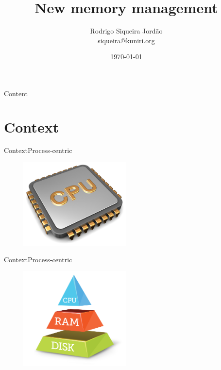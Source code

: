 \documentclass[10pt]{beamer}
\title[] %
{ %
  \textbf{New memory management}
}
\subtitle[SpaceJMP a new approach]
{
}
\author[Rodrigo Siqueira Jordão]
{      Rodrigo Siqueira Jordão \\
      {\ttfamily siqueira@kuniri.org}
}
\institute[]
{
  University of Sao Paulo\\
  Institute of Mathematics and Statistics\\
  
}
\date{\today}
\begin{document}

{\1%
\begin{frame} 
  \titlepage %
\end{frame}}

\begin{frame}[shrink]{Content}{}
  \tableofcontents
\end{frame}

\section{Context}
\begin{frame}{Context}{Process-centric}
  \begin{figure}[ht]
    \centering
    \includegraphics[width=0.5\textwidth, keepaspectratio=true]{images/processor-centric.png}
  \end{figure}
\end{frame}

\begin{frame}{Context}{Process-centric}
  \begin{figure}[ht]
    \centering
    \includegraphics[width=0.5\textwidth, keepaspectratio=true]{images/memory_hierarchy.png}
  \end{figure}
\end{frame}
\end{document}

